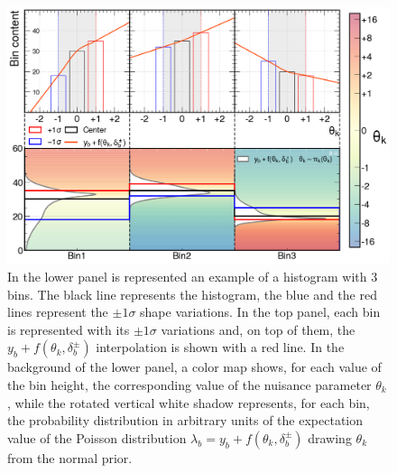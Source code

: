 \begin{itemize}
    \begin{figure}[h!]
        \centering
        \includegraphics[width=\linewidth]{fig//chap05-stats/morphing.png}
        \caption{In the lower panel is represented an example of a histogram with 3 bins. The black line represents the histogram, the blue and the red lines represent the $\pm 1 \sigma$ shape variations.
        In the top panel, each bin is represented with its $\pm 1 \sigma$ variations and, on top of them, the $y_b+f(\theta_k,\delta_b^\pm)$ interpolation is shown with a red line. In the background of the lower panel, a color map shows, for each value of the bin height, the corresponding value of the nuisance parameter $\theta_k$, while the rotated vertical white shadow represents, for each bin, the probability distribution in arbitrary units of the expectation value of the Poisson distribution $\lambda_b=y_b+f(\theta_k,\delta_b^\pm)$ drawing $\theta_k$ from the normal prior.}
        \label{fig:morphing}
    \end{figure}



\end{itemize}
